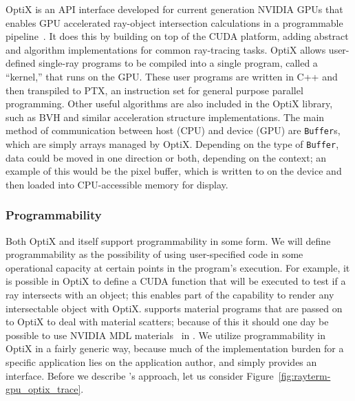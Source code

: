 OptiX is an API interface developed for current generation NVIDIA GPUs that enables GPU accelerated ray-object intersection calculations in a programmable pipeline~\cite{parker2010optix, nvidia2019optixdoc}.
It does this by building on top of the CUDA platform, adding abstract and algorithm implementations for common ray-tracing tasks.
OptiX allows user-defined single-ray programs to be compiled into a single program, called a ``kernel,'' that runs on the GPU.
These user programs are written in C++ and then transpiled to PTX, an instruction set for general purpose parallel programming.
Other useful algorithms are also included in the OptiX library, such as BVH and similar acceleration structure implementations.
The main method of communication between host (CPU) and device (GPU) are \texttt{Buffer}s, which are simply arrays managed by OptiX.
Depending on the type of \texttt{Buffer}, data could be moved in one direction or both, depending on the context; an example of this would be the pixel buffer, which is written to on the device and then loaded into CPU-accessible memory for display.

\subsubsection{Programmability}
\label{ch:methods:renderer:parallel:program}

Both OptiX and \name{} itself support programmability in some form.
We will define programmability as the possibility of using user-specified code in some operational capacity at certain points in the program's execution.
For example, it is possible in OptiX to define a CUDA function that will be executed to test if a ray intersects with an object; this enables part of the capability to render any intersectable object with OptiX.
 \name{} supports material programs that are passed on to OptiX to deal with material scatters; because of this it should one day be possible to use NVIDIA MDL materials~\cite{nvidia2015mdl} in \name{}.
We utilize programmability in OptiX in a fairly generic way, because much of the implementation burden for a specific application lies on the application author, and \name{} simply provides an interface.
Before we describe \name{}'s approach, let us consider Figure~\ref{fig:rayterm-gpu_optix_trace}.


